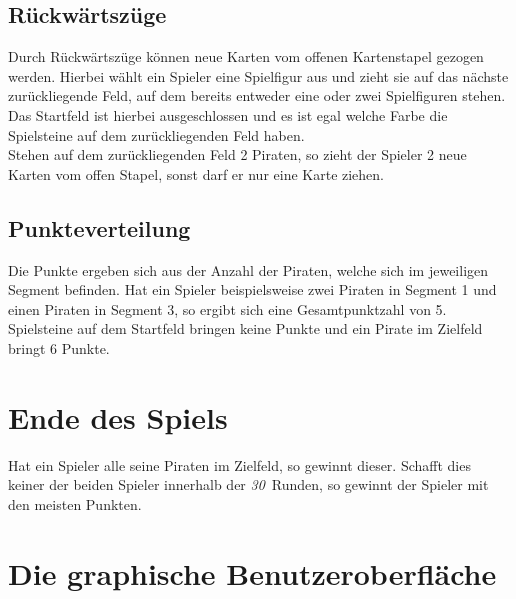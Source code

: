 \documentclass{scrartcl}
\newcommand{\RundenAnzahl}{\emph{30}}
\begin{document}
	\subsection{Rückwärtszüge}
	Durch Rückwärtszüge können neue Karten vom offenen Kartenstapel gezogen werden.
	Hierbei wählt ein Spieler eine Spielfigur aus und zieht sie auf das nächste
	zurückliegende Feld, auf dem bereits entweder eine oder zwei Spielfiguren
	stehen. Das Startfeld ist hierbei ausgeschlossen und es ist egal welche Farbe
	die Spielsteine auf dem zurückliegenden Feld haben.\\
	Stehen auf dem zurückliegenden Feld 2 Piraten, so zieht der Spieler 2 neue
	Karten vom offen Stapel, sonst darf er nur eine Karte ziehen.
	\subsection{Punkteverteilung}
	Die Punkte ergeben sich aus der Anzahl der Piraten, welche sich im jeweiligen
	Segment befinden. Hat ein Spieler beispielsweise zwei Piraten in Segment 1 und
	einen Piraten in Segment 3, so ergibt sich eine Gesamtpunktzahl von 5.\\
	Spielsteine auf dem Startfeld bringen keine Punkte und ein Pirate im Zielfeld
	bringt 6 Punkte.
\section{Ende des Spiels}
	Hat ein Spieler alle seine Piraten im Zielfeld, so gewinnt dieser. Schafft dies
	keiner der beiden Spieler innerhalb der \RundenAnzahl\ Runden, so
	gewinnt der Spieler mit den meisten Punkten.
\section{Die graphische Benutzeroberfläche}
\end{document}
